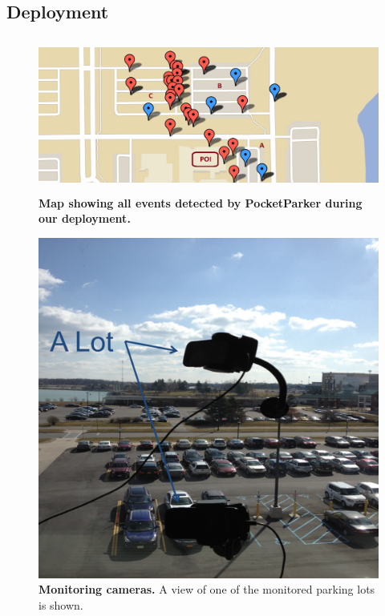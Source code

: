 \subsection{Deployment}

\begin{figure}
\centering
\includegraphics[width=\textwidth,height=2in]{./figures/detectedEventsOnMap.pdf}

\caption{\textbf{Map showing all events detected by PocketParker during our
deployment.} }

\label{fig-energy}
\end{figure}

\begin{figure}
\centering
\includegraphics[width=\columnwidth]{./figures/Camera_setting.pdf}

\caption{\textbf{Monitoring cameras.} A view of one of the monitored parking
lots is shown.}

\label{fig-camera}
\end{figure}
